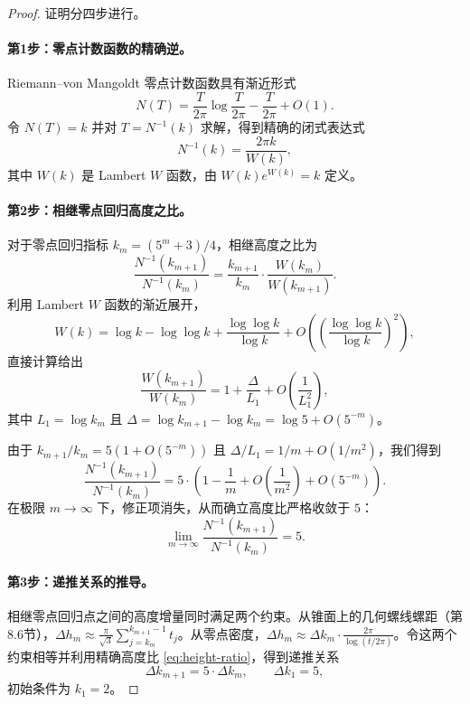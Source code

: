 \documentclass[12pt,a4paper]{article}
\begin{document}
\begin{proof}
证明分四步进行。

\paragraph{第1步：零点计数函数的精确逆。}
Riemann--von Mangoldt 零点计数函数具有渐近形式
\begin{equation}
N(T) = \frac{T}{2\pi} \log \frac{T}{2\pi} - \frac{T}{2\pi} + O(1).
\end{equation}
令 $N(T) = k$ 并对 $T = N^{-1}(k)$ 求解，得到精确的闭式表达式
\begin{equation}
N^{-1}(k) = \frac{2\pi k}{W(k)},
\end{equation}
其中 $W(k)$ 是 Lambert $W$ 函数，由 $W(k)e^{W(k)} = k$ 定义。

\paragraph{第2步：相继零点回归高度之比。}
对于零点回归指标 $k_m = (5^m+3)/4$，相继高度之比为
\begin{equation}
\frac{N^{-1}(k_{m+1})}{N^{-1}(k_m)} = \frac{k_{m+1}}{k_m} \cdot \frac{W(k_m)}{W(k_{m+1})}.
\end{equation}
利用 Lambert $W$ 函数的渐近展开，
\begin{equation}
W(k) = \log k - \log \log k + \frac{\log \log k}{\log k} + O\left(\left(\frac{\log \log k}{\log k}\right)^2\right),
\end{equation}
直接计算给出
\begin{equation}
\frac{W(k_{m+1})}{W(k_m)} = 1 + \frac{\Delta}{L_1} + O\left(\frac{1}{L_1^2}\right),
\end{equation}
其中 $L_1 = \log k_m$ 且 $\Delta = \log k_{m+1} - \log k_m = \log 5 + O(5^{-m})$。

由于 $k_{m+1}/k_m = 5(1 + O(5^{-m}))$ 且 $\Delta/L_1 = 1/m + O(1/m^2)$，我们得到
\begin{equation}
\frac{N^{-1}(k_{m+1})}{N^{-1}(k_m)} = 5 \cdot \left(1 - \frac{1}{m} + O\left(\frac{1}{m^2}\right) + O(5^{-m})\right).
\end{equation}
在极限 $m \to \infty$ 下，修正项消失，从而确立高度比严格收敛于 $5$：
\begin{equation}
\lim_{m \to \infty} \frac{N^{-1}(k_{m+1})}{N^{-1}(k_m)} = 5.
\label{eq:height-ratio}
\end{equation}

\paragraph{第3步：递推关系的推导。}
相继零点回归点之间的高度增量同时满足两个约束。从锥面上的几何螺线螺距（第8.6节），$\Delta h_m \approx \frac{\pi}{\sqrt{3}} \sum_{j=k_m}^{k_{m+1}-1} t_j$。从零点密度，$\Delta h_m \approx \Delta k_m \cdot \frac{2\pi}{\log(t/2\pi)}$。令这两个约束相等并利用精确高度比 \eqref{eq:height-ratio}，得到递推关系
\begin{equation}
\Delta k_{m+1} = 5 \cdot \Delta k_m, \qquad \Delta k_1 = 5,
\end{equation}
初始条件为 $k_1 = 2$。


\end{proof}
\end{document}

